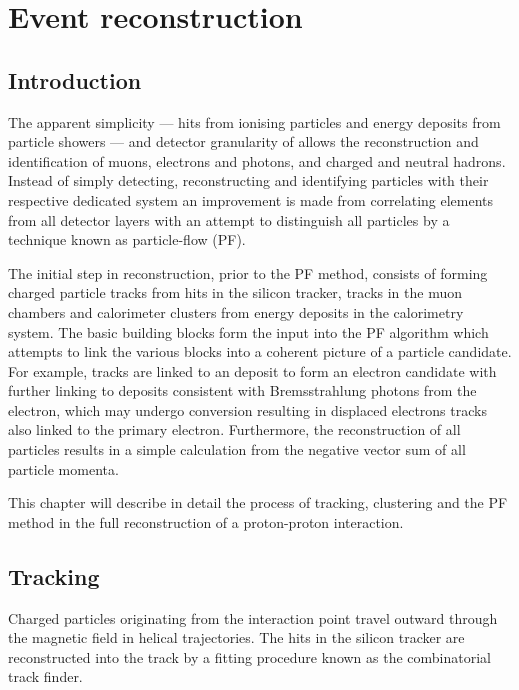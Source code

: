 \chapter{Event reconstruction}\label{chap:reconstruction}


\section{Introduction}

The apparent simplicity --- hits from ionising particles and energy deposits
from particle showers --- and detector granularity of \CMS allows the
reconstruction and identification of muons, electrons and photons, and charged
and neutral hadrons. Instead of simply detecting, reconstructing and
identifying particles with their respective dedicated system an improvement is
made from correlating elements from all detector layers with an attempt to
distinguish all particles by a technique known as particle-flow (PF).

The initial step in reconstruction, prior to the PF method, consists of
forming charged particle tracks from hits in the silicon tracker, tracks in
the muon chambers and calorimeter clusters from energy deposits in the
calorimetry system. The basic building blocks form the input into the PF
algorithm which attempts to link the various blocks into a coherent picture of
a particle candidate. For example, tracks are linked to an \ECAL deposit to
form an electron candidate with further linking to \ECAL deposits consistent
with Bremsstrahlung photons from the electron, which may undergo conversion
resulting in displaced electrons tracks also linked to the primary electron.
Furthermore, the reconstruction of all particles results in a simple \ptmiss
calculation from the negative vector sum of all particle momenta.

This chapter will describe in detail the process of tracking, clustering and
the PF method in the full reconstruction of a proton-proton interaction.


\section{Tracking}

Charged particles originating from the interaction point travel outward
through the magnetic field in helical trajectories. The hits in the silicon
tracker are reconstructed into the track by a fitting procedure known as the
combinatorial track finder.


